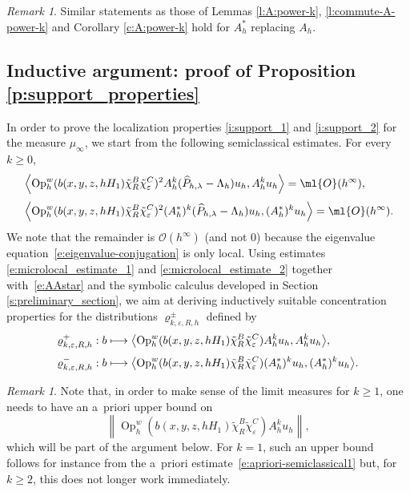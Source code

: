 \documentclass[JEP,XML,SOM,Unicode, NoEqCountersInSection,published]{cedram}
\newcommand\mto{\mathchoice{\longmapsto}{\mapsto}{\mapsto}{\mapsto}}
\theoremstyle{plain}
\theoremstyle{definition}
\theoremstyle{remark}
\newtheorem{rema}[theo]{Remark}
\newcommand{\Op}{\operatorname{Op}}
\begin{document}
\begin{rema}
Similar statements as those of Lemmas \ref{l:A:power-k}, \ref{l:commute-A-power-k} and Corollary \ref{c:A:power-k} hold for $A_h^*$ replacing $A_h$.
\end{rema}

\subsection{Inductive argument: proof of Proposition \ref{p:support_properties}}

In order to prove the localization properties \eqref{i:support_1} and \eqref{i:support_2} for the measure $\mu_\infty$, we start from the following semiclassical estimates. For every $k\geq 0$,
\begin{align}
\label{e:microlocal_estimate_1}
& \left\langle \Op_h^w(b(x,y,z,hH_1)\tilde{\chi}_R^B\tilde{\chi}_\varepsilon^C)^2A_h^k(\widehat{P}_{h,\lambda}-\Lambda_h)u_h,A_h^ku_h\right\rangle = \ml{O}(h^\infty), \\[3pt]
\label{e:microlocal_estimate_2}
& \left\langle \Op_h^w(b(x,y,z,hH_1)\tilde{\chi}_R^B\tilde{\chi}_\varepsilon^C)^2(A^*_h)^k(\widehat{P}_{h,\lambda}-\Lambda_h)u_h,(A^*_h)^ku_h\right\rangle = \ml{O}(h^\infty).
\end{align}
We note that the remainder is $\mathcal{O}(h^\infty)$ (and not $0$) because the eigenvalue equation~\eqref{e:eigenvalue-conjugation} is only local. Using estimates \eqref{e:microlocal_estimate_1} and \eqref{e:microlocal_estimate_2} together with~\eqref{e:AAstar} and the symbolic calculus developed in Section \ref{s:preliminary_section}, we aim at deriving inductively suitable concentration properties for the distributions $\varrho^\pm_{k,\varepsilon,R,h}$ defined by
\begin{align*}
\varrho^+_{k,\varepsilon,R,h} & : b \mto \bigl\langle \Op_h^w(b(x,y,z,hH_1)\tilde{\chi}_R^B\tilde{\chi}_\varepsilon^C)A_h^ku_h,A_h^ku_h\bigr\rangle, \\[3pt]
\varrho_{k,\varepsilon,R,h}^-& : b \mto \bigl\langle \Op_h^w(b(x,y,z,hH_1)\tilde{\chi}_R^B\tilde{\chi}_\varepsilon^C)(A^*_h)^ku_h,(A^*_h)^k u_h\bigr\rangle.
\end{align*}
\begin{rema} Note that, in order to make sense of the limit measures for $k\geq 1$, one needs to have an a~priori upper bound on
\[
\left\| \Op_h^w(b(x,y,z,hH_1)\tilde{\chi}_R^B\tilde{\chi}_\varepsilon^C)A_h^ku_h\right\|,
\]
which will be part of the argument below. For $k=1$, such an upper bound follows for instance from the a~priori estimate~\eqref{e:apriori-semiclassical1} but, for $k\geq 2$, this does not longer work immediately.
\end{rema}
\end{document}

